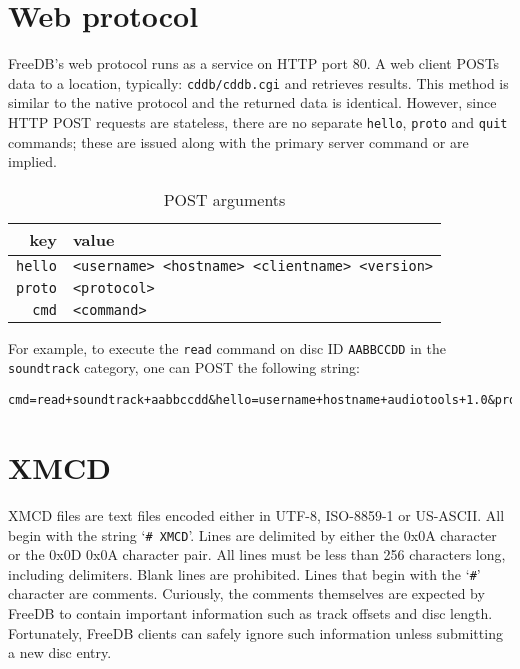 \pagebreak

\section{Web protocol}
FreeDB's web protocol runs as a service on HTTP port 80.
A web client POSTs data to a location, typically: \texttt{cddb/cddb.cgi}
and retrieves results.
This method is similar to the native protocol and the returned
data is identical.
However, since HTTP POST requests are stateless,
there are no separate \texttt{hello}, \texttt{proto} and \texttt{quit}
commands; these are issued along with the primary server command or are
implied.
\begin{table}[h]
\begin{tabular}{|r|l|}
\hline
key & value \\
\hline
\texttt{hello} &
\texttt{<username> <hostname> <clientname> <version>} \\
\texttt{proto} &
\texttt{<protocol>} \\
\texttt{cmd} &
\texttt{<command>} \\
\hline
\end{tabular}
\caption{POST arguments}
\end{table}
\par
\noindent
For example, to execute the \texttt{read} command on disc ID \texttt{AABBCCDD}
in the \texttt{soundtrack} category, one can POST the following string:
\begin{Verbatim}[frame=single]
cmd=read+soundtrack+aabbccdd&hello=username+hostname+audiotools+1.0&proto=6
\end{Verbatim}

\section{XMCD}

XMCD files are text files encoded either in UTF-8, ISO-8859-1 or
US-ASCII.
All begin with the string `\texttt{\# XMCD}'.
Lines are delimited by either the 0x0A character
or the 0x0D 0x0A character pair.
All lines must be less than 256 characters long,
including delimiters.
Blank lines are prohibited.
Lines that begin with the `\texttt{\#}' character are comments.
Curiously, the comments themselves are expected by FreeDB to contain
important information such as track offsets and disc length.
Fortunately, FreeDB clients can safely ignore such information
unless submitting a new disc entry.

